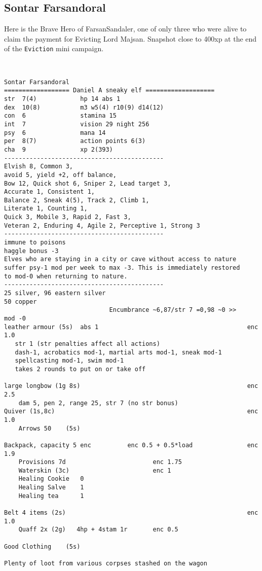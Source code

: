 \clearpage
\begin{samepage}
\subsection*{Sontar Farsandoral}
\noindent Here is the Brave Hero of FarsanSandaler, one of only three who were alive to claim the payment for Evicting Lord Majsan. Snapshot close to 400xp at the end of the \texttt{Eviction} mini campaign.

\

\small \begin{verbatim}
Sontar Farsandoral
================== Daniel A sneaky elf ===================
str  7(4)            hp 14 abs 1
dex  10(8)           m3 w5(4) r10(9) d14(12)
con  6               stamina 15
int  7               vision 29 night 256
psy  6               mana 14
per  8(7)            action points 6(3)
cha  9               xp 2(393)
--------------------------------------------
Elvish 8, Common 3,
avoid 5, yield +2, off balance,
Bow 12, Quick shot 6, Sniper 2, Lead target 3,
Accurate 1, Consistent 1,
Balance 2, Sneak 4(5), Track 2, Climb 1,
Literate 1, Counting 1,
Quick 3, Mobile 3, Rapid 2, Fast 3,
Veteran 2, Enduring 4, Agile 2, Perceptive 1, Strong 3
--------------------------------------------
immune to poisons
haggle bonus -3
Elves who are staying in a city or cave without access to nature
suffer psy-1 mod per week to max -3. This is immediately restored
to mod-0 when returning to nature.
--------------------------------------------
25 silver, 96 eastern silver
50 copper
                             Encumbrance ~6,87/str 7 =0,98 ~0 >>    mod -0
leather armour (5s)  abs 1                                         enc 1.0
   str 1 (str penalties affect all actions)
   dash-1, acrobatics mod-1, martial arts mod-1, sneak mod-1
   spellcasting mod-1, swim mod-1
   takes 2 rounds to put on or take off

large longbow (1g 8s)                                              enc 2.5
    dam 5, pen 2, range 25, str 7 (no str bonus)
Quiver (1s,8c)                                                     enc 1.0
    Arrows 50    (5s)

Backpack, capacity 5 enc          enc 0.5 + 0.5*load               enc 1.9
    Provisions 7d                        enc 1.75
    Waterskin (3c)                       enc 1
    Healing Cookie   0
    Healing Salve    1
    Healing tea      1

Belt 4 items (2s)                                                  enc 1.0
    Quaff 2x (2g)   4hp + 4stam 1r       enc 0.5

Good Clothing    (5s)

Plenty of loot from various corpses stashed on the wagon
\end{verbatim} \end{samepage} \normalsize




